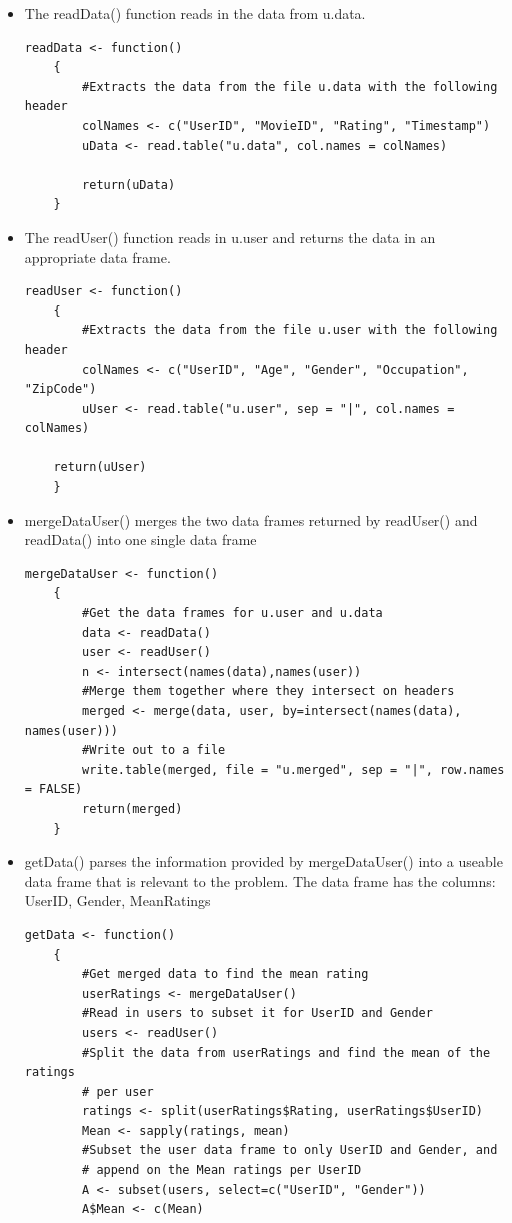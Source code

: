 \documentclass[11pt]{article}  %
\begin{document}
\begin{itemize}
    \label{appendix:readData}
    \item The readData() function reads in the data from u.data.
    \begin{lstlisting}[basicstyle=\small]
    readData <- function()
    {
    	#Extracts the data from the file u.data with the following header
    	colNames <- c("UserID", "MovieID", "Rating", "Timestamp")
    	uData <- read.table("u.data", col.names = colNames)
    	
    	return(uData)
    }
    \end{lstlisting}
    
    \label{appendix:readUser}
    \item The readUser() function reads in u.user and returns the data in an appropriate data frame.
    \begin{lstlisting}[basicstyle=\small]
    readUser <- function()
    {
    	#Extracts the data from the file u.user with the following header
    	colNames <- c("UserID", "Age", "Gender", "Occupation", "ZipCode")
    	uUser <- read.table("u.user", sep = "|", col.names = colNames)

	return(uUser)
    }
    \end{lstlisting}
    

    \item mergeDataUser() merges the two data frames returned by readUser() and readData() into one single data frame
    \begin{lstlisting}[basicstyle=\small]
    mergeDataUser <- function()
    {
    	#Get the data frames for u.user and u.data
    	data <- readData()
    	user <- readUser()
    	n <- intersect(names(data),names(user))
    	#Merge them together where they intersect on headers
    	merged <- merge(data, user, by=intersect(names(data), names(user)))
    	#Write out to a file
    	write.table(merged, file = "u.merged", sep = "|", row.names = FALSE)
    	return(merged)
    }
    \end{lstlisting}
    

    \item getData() parses the information provided by mergeDataUser() into a useable data frame that is relevant to the problem. The data frame has the columns:\\
    UserID, Gender, MeanRatings
    \begin{lstlisting}[basicstyle=\small]
    getData <- function()
    {
    	#Get merged data to find the mean rating
    	userRatings <- mergeDataUser()
    	#Read in users to subset it for UserID and Gender
    	users <- readUser()
    	#Split the data from userRatings and find the mean of the ratings
    	# per user
    	ratings <- split(userRatings$Rating, userRatings$UserID)
    	Mean <- sapply(ratings, mean)
    	#Subset the user data frame to only UserID and Gender, and
    	# append on the Mean ratings per UserID
    	A <- subset(users, select=c("UserID", "Gender"))
    	A$Mean <- c(Mean)
    

\end{lstlisting}
\end{itemize}
\end{document}
